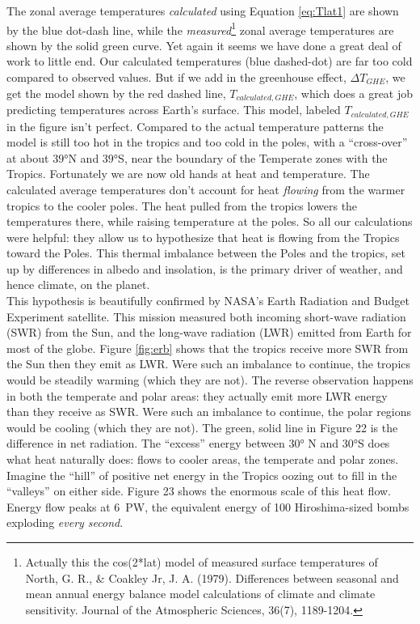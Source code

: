 The zonal average temperatures \textit{calculated} using Equation \ref{eq:Tlat1} are shown by the blue dot-dash line, while the \textit{measured}\footnote{Actually this the cos(2*lat) model of measured surface temperatures of North, G. R., \& Coakley Jr, J. A. (1979). Differences between seasonal and mean annual energy balance model calculations of climate and climate sensitivity. Journal of the Atmospheric Sciences, 36(7), 1189-1204.} zonal average temperatures are shown by the solid green curve. Yet again it seems we have done a great deal of work to little end. Our calculated temperatures (blue dashed-dot) are far too cold compared to observed values. But if we add in the greenhouse effect, $\Delta T_{GHE}$, we get the model shown by the red dashed line, $T_{calculated, GHE}$, which does a great job predicting temperatures across Earth's surface. This model, labeled $T_{calculated, GHE}$ in the figure isn't perfect. Compared to the actual temperature patterns the model is still too hot in the tropics and too cold in the poles, with a ``cross-over'' at about $\ang{39}$N and $\ang{39}$S, near the boundary of the Temperate zones with the Tropics. Fortunately we are now old hands at heat and temperature. The calculated average temperatures don't account for heat \emph{flowing} from the warmer tropics to the cooler poles. The heat pulled from the tropics lowers the temperatures there, while raising temperature at the poles. So all our calculations were helpful: they allow us to hypothesize that heat is flowing from the Tropics toward the Poles. This thermal imbalance between the Poles and the tropics, set up by differences in albedo and insolation, is the primary driver of weather, and hence climate, on the planet.\\
This hypothesis is beautifully confirmed by NASA's Earth Radiation and Budget Experiment satellite. This mission measured both incoming short-wave radiation (SWR) from the Sun, and the long-wave radiation (LWR) emitted from Earth for most of the globe. Figure \ref{fig:erb} shows that the tropics receive more SWR from the Sun then they emit as LWR. Were such an imbalance to continue, the tropics would be steadily warming (which they are not). The reverse observation happens in both the temperate and polar areas: they actually emit more LWR energy than they receive as SWR. Were such an imbalance to continue, the polar regions would be cooling (which they are not). The green, solid line in Figure 22 is the difference in net radiation. The ``excess'' energy between $\ang{30}$ N and $\ang{30}$S does what heat naturally does: flows to cooler areas, the temperate and polar zones. Imagine the ``hill'' of positive net energy in the Tropics oozing out to fill in the ``valleys'' on either side. Figure 23 shows the enormous scale of this heat flow. Energy flow peaks at \SI{6}{\peta\watt}, the equivalent energy of 100 Hiroshima-sized bombs exploding \emph{every second}.\\
